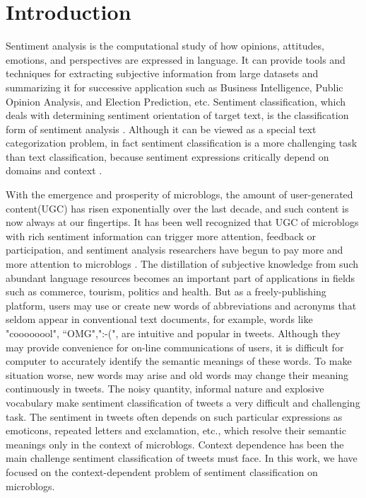 \documentclass{llncs}
\begin{document}
\section{Introduction}
\label{intro}

Sentiment analysis is the computational study of how opinions, attitudes, emotions, and perspectives are expressed in language. 
It can provide tools and techniques for extracting subjective information from large datasets and summarizing it for successive application such as Business Intelligence, Public Opinion Analysis, and Election Prediction, etc. \cite{xsongx:b1} 
Sentiment classification, which deals with determining sentiment orientation of target text, is the classification form of sentiment analysis \cite{xsongx:b2}. 
Although it can be viewed as a special text categorization problem, in fact sentiment classification is a more challenging task than text classification, because sentiment expressions critically depend on domains and context \cite{xsongx:b6}.

With the emergence and prosperity of microblogs, the amount of user-generated content(UGC) has risen exponentially over the last decade, and such content is now always at our fingertips.
It has been well recognized that UGC of microblogs with rich sentiment information can trigger more attention, feedback or participation, and sentiment analysis researchers have begun to pay more and more attention to microblogs \cite{DBLP:conf/hicss/StieglitzD12}.
The distillation of subjective knowledge from such abundant language resources becomes an important part of applications in fields such as commerce, tourism, politics and health. 
But as a freely-publishing platform, users may use or create new words of abbreviations and acronyms that seldom appear in conventional text documents, for example, words like "coooooool", “OMG",":-(", are intuitive and popular in tweets.
Although they may provide convenience for on-line communications of users, it is difficult for computer to accurately identify the semantic meanings of these words. 
To make situation worse, new words may arise and old words may change their meaning continuously in tweets.
The noisy quantity, informal nature and explosive vocabulary make sentiment classification of tweets a very difficult and challenging task. 
The sentiment in tweets often depends on such particular expressions as emoticons, repeated letters and exclamation, etc., which resolve their semantic meanings only in the context of microblogs. 
Context dependence has been the main challenge sentiment classification of tweets must face.
In this work, we have focused on the context-dependent problem of sentiment classification on microblogs. 
\end{document}
